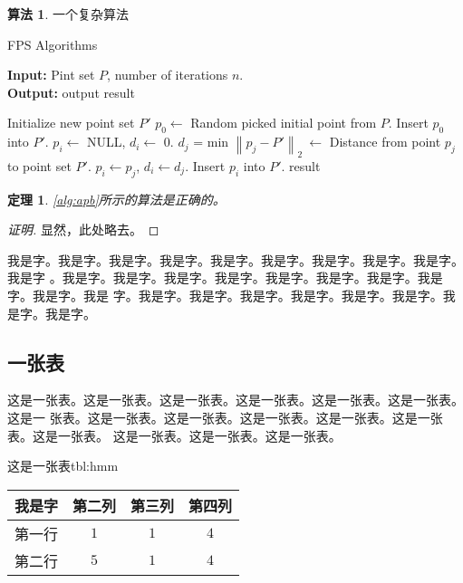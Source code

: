 \documentclass[supercite]{HustMasterReport}
\newcommand{\ralg}[1]{\autoref{alg:#1}}
\newtheorem{thm}{定理}[section]
\theoremstyle{definition}
\newtheorem{alg}{算法}[section]
\begin{document}
\begin{alg}{一个复杂算法}
  \label{alg:apb}
    \begin{algorithm}
            \caption{FPS Algorithms}
            \hspace*{0.02in} {\bf Input:} %
                Pint set $P$, number of iterations $n$.\\
            \hspace*{0.02in} {\bf Output:} %
                output result
    	\begin{algorithmic}
    		\State Initialize new point set $P'$
    		\State $p_0 \leftarrow$ Random picked initial point from $P$.
    		\State Insert $p_0$ into $P'$.
    		\State $p_i \leftarrow$ NULL, $d_i \leftarrow$ 0.
    		\State $d_j$ = min $\left\|p_j - P'\right\|_2\ \leftarrow$ Distance from point $p_j$ to point set $P'$.
    		\State $p_i \leftarrow p_j$, $d_i \leftarrow d_j$.
    	    \EndIf
    	    \EndFor
    	    \State Insert $p_i$ into $P'$.
    	    \EndFor
    		\State \Return result
    	\end{algorithmic}
    \end{algorithm}
\end{alg}

\begin{thm} \label{thm:gsb-apprx}
  \ralg{apb}所示的算法是正确的。
\end{thm}
\begin{proof}[证明]
  显然，此处略去。
\end{proof}

我是字。我是字。我是字。我是字。我是字。我是字。我是字。我是字。我是字。我是字
。我是字。我是字。我是字。我是字。我是字。我是字。我是字。我是字。我是字。我是
字。我是字。我是字。我是字。我是字。我是字。我是字。我是字。我是字。

\subsection{一张表}

这是一张表。这是一张表。这是一张表。这是一张表。这是一张表。这是一张表。这是一
张表。这是一张表。这是一张表。这是一张表。这是一张表。这是一张表。这是一张表。
这是一张表。这是一张表。这是一张表。

\begin{generaltab}{这是一张表}{tbl:hmm}
  \begin{tabular}{c|ccc}
    \toprule
    我是字 & 第二列 & 第三列 & 第四列 \\
    \midrule
    第一行 & $1$ & $1$ & $4$ \\
    第二行 & $5$ & $1$ & $4$ \\
    \bottomrule
  \end{tabular}
\end{generaltab}
\end{document}
